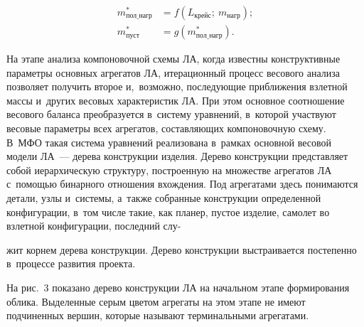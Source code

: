 \begin{multicols}{2}
\vspace*{-4pt}

 \noindent
\begin{align*}
m^*_{\mathrm{пол\_нагр}} &= f\left(L_{\mathrm{крейс}};\ m_{\mathrm{нагр}}\right);\\
 m^*_{\mathrm{пуст}}  &= g(m^*_{\mathrm{пол\_нагр}}).
 \end{align*}

\vspace*{-4pt}
  
 
  На этапе анализа компоновочной схемы ЛА, когда известны конструктивные 
параметры основных агрегатов ЛА, итерационный процесс весового анализа 
позволяет получить второе и,~возможно, по\-сле\-ду\-ющие при\-бли\-же\-ния взлетной 
массы и~других весовых характеристик ЛА. При этом основное соотношение 
весового баланса преобразуется в~сис\-те\-му уравнений, в~которой участвуют 
весовые па\-ра\-мет\-ры всех агрегатов, со\-став\-ля\-ющих компоновочную схему. 
В~МФО такая сис\-те\-ма уравнений реализована в~рамках основной весовой 
модели ЛА~--- дерева конструкции изделия. Дерево конструкции представляет 
собой иерархическую структуру, построенную на множестве агрегатов ЛА 
с~помощью бинарного отношения вхож\-де\-ния. Под агрегатами здесь 
понимаются детали, узлы и~сис\-те\-мы, а~так\-же собранные конструкции 
определенной конфигурации, в~том чис\-ле такие, как планер, пустое изделие, 
самолет во взлетной конфигурации, последний слу-\linebreak\vspace*{-12pt}

\columnbreak

\noindent
жит корнем дерева 
конструкции. Дерево конструкции выстраивается постепенно в~процессе 
развития проекта. 

На рис.~3 показано дерево конструкции ЛА на начальном 
этапе формирования облика. Выделенные серым цветом агрегаты на этом этапе 
не имеют подчиненных вершин, которые называют терминальными агрегатами.
  




\end{multicols}
